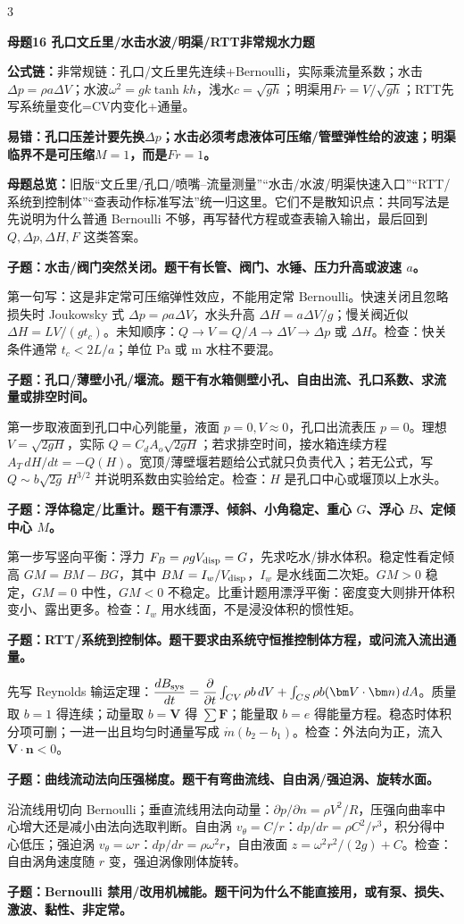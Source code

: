 \documentclass[a4paper]{article}
\newcommand{\mt}[1]{\vspace{0.22pt}\colorbox{M}{\parbox{\dimexpr\linewidth-2\fboxsep}{\color{white}\bfseries #1}}\par}
\newcommand{\qt}[1]{\vspace{0.10pt}\colorbox{Q}{\parbox{\dimexpr\linewidth-2\fboxsep}{\color{white}\bfseries #1}}\par}
\newcommand{\ans}[1]{\colorbox{G}{\parbox{\dimexpr\linewidth-2\fboxsep}{#1}}\par}
\newcommand{\warn}[1]{\colorbox{Y}{\parbox{\dimexpr\linewidth-2\fboxsep}{\color{E}\bfseries #1}}\par}
\newcommand{\form}[1]{{\color{M}\bfseries 公式链：}#1\par}
\newcommand{\mview}[1]{\ans{\textbf{母题总览：}#1}}
\begin{document}
\begin{multicols}{3}
\mt{母题16 孔口文丘里/水击水波/明渠/RTT非常规水力题}
\form{非常规链：孔口/文丘里先连续+Bernoulli，实际乘流量系数；水击$\Delta p=\rho a\Delta V$；水波$\omega^2=gk\tanh kh$，浅水$c=\sqrt{gh}$；明渠用$Fr=V/\sqrt{gh}$；RTT先写系统量变化=CV内变化+通量。}
\warn{易错：孔口压差计要先换$\Delta p$；水击必须考虑液体可压缩/管壁弹性给的波速；明渠临界不是可压缩$M=1$，而是$Fr=1$。}
\mview{旧版“文丘里/孔口/喷嘴--流量测量”“水击/水波/明渠快速入口”“RTT/系统到控制体”“查表动作标准写法”统一归这里。它们不是散知识点：共同写法是先说明为什么普通 Bernoulli 不够，再写替代方程或查表输入输出，最后回到 $Q,\Delta p,\Delta H,F$ 这类答案。}
\qt{子题：水击/阀门突然关闭。题干有长管、阀门、水锤、压力升高或波速 $a$。}
\ans{第一句写：这是非定常可压缩弹性效应，不能用定常 Bernoulli。快速关闭且忽略损失时 Joukowsky 式 $\Delta p=\rho a\Delta V$，水头升高 $\Delta H=a\Delta V/g$；慢关阀近似 $\Delta H=LV/(gt_c)$。未知顺序：$Q\to V=Q/A\to\Delta V\to\Delta p$ 或 $\Delta H$。检查：快关条件通常 $t_c<2L/a$；单位 Pa 或 m 水柱不要混。}
\qt{子题：孔口/薄壁小孔/堰流。题干有水箱侧壁小孔、自由出流、孔口系数、求流量或排空时间。}
\ans{第一步取液面到孔口中心列能量，液面 $p=0,V\approx0$，孔口出流表压 $p=0$。理想 $V=\sqrt{2gH}$，实际 $Q=C_dA_o\sqrt{2gH}$；若求排空时间，接水箱连续方程 $A_T\,dH/dt=-Q(H)$。宽顶/薄壁堰若题给公式就只负责代入；若无公式，写 $Q\sim b\sqrt{2g}\,H^{3/2}$ 并说明系数由实验给定。检查：$H$ 是孔口中心或堰顶以上水头。}
\qt{子题：浮体稳定/比重计。题干有漂浮、倾斜、小角稳定、重心 $G$、浮心 $B$、定倾中心 $M$。}
\ans{第一步写竖向平衡：浮力 $F_B=\rho gV_{\rm disp}=G$，先求吃水/排水体积。稳定性看定倾高 $GM=BM-BG$，其中 $BM=I_w/V_{\rm disp}$，$I_w$ 是水线面二次矩。$GM>0$ 稳定，$GM=0$ 中性，$GM<0$ 不稳定。比重计题用漂浮平衡：密度变大则排开体积变小、露出更多。检查：$I_w$ 用水线面，不是浸没体积的惯性矩。}
\qt{子题：RTT/系统到控制体。题干要求由系统守恒推控制体方程，或问流入流出通量。}
\ans{先写 Reynolds 输运定理：$\dfrac{dB_{\rm sys}}{dt}=\dfrac{\partial}{\partial t}\int_{CV}\rho b\,dV+\int_{CS}\rho b(\bm V\cdot\bm n)\,dA$。质量取 $b=1$ 得连续；动量取 $b=\bm V$ 得 $\sum\bm F$；能量取 $b=e$ 得能量方程。稳态时体积分项可删；一进一出且均匀时通量写成 $\dot m(b_2-b_1)$。检查：外法向为正，流入 $\bm V\cdot\bm n<0$。}
\qt{子题：曲线流动法向压强梯度。题干有弯曲流线、自由涡/强迫涡、旋转水面。}
\ans{沿流线用切向 Bernoulli；垂直流线用法向动量：$\partial p/\partial n=\rho V^2/R$，压强向曲率中心增大还是减小由法向选取判断。自由涡 $v_\theta=C/r$：$dp/dr=\rho C^2/r^3$，积分得中心低压；强迫涡 $v_\theta=\omega r$：$dp/dr=\rho\omega^2r$，自由液面 $z=\omega^2r^2/(2g)+C$。检查：自由涡角速度随 $r$ 变，强迫涡像刚体旋转。}
\qt{子题：Bernoulli 禁用/改用机械能。题干问为什么不能直接用，或有泵、损失、激波、黏性、非定常。}

\end{multicols}
\end{document}
